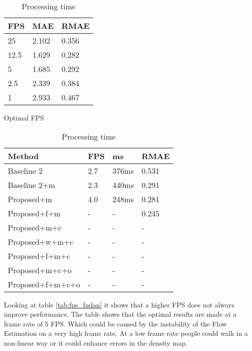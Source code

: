 \begin{table}[!htb]
\begin{minipage}{.5\linewidth}
\centering
\begin{tabular}{lll}
		\hline
		FPS                               & MAE & RMAE \\ \hline
		\multicolumn{1}{l|}{25}          & 2.102 & 0.356 \\
		\multicolumn{1}{l|}{12.5}        & 1.629 & 0.282 \\
		\multicolumn{1}{l|}{5}        & 1.685 & 0.292 \\
		\multicolumn{1}{l|}{2.5} & 2.339 & 0.384 \\
		\multicolumn{1}{l|}{1} & 2.933 & 0.467 \\ \hline
		\end{tabular}
\caption{\label{tab:fps_fudan} Optimal FPS}
\end{minipage}
\begin{minipage}{.5\linewidth}
\centering
\begin{tabular}{llll}
\hline
Method                             & FPS & ms & RMAE \\ \hline
\multicolumn{1}{l|}{Baseline 2}    & 2.7 & 376ms & 0.531 \\
\multicolumn{1}{l|}{Baseline 2+m} & 2.3 & 440ms & 0.291\\
\multicolumn{1}{l|}{Proposed+m}      & 4.0 & 248ms & 0.281 \\
\multicolumn{1}{l|}{Proposed+f+m} &- & - & 0.245 \\
\multicolumn{1}{l|}{Proposed+m+c}        & - & - & - \\
\multicolumn{1}{l|}{Proposed+w+m+c}        & - & - & - \\
\multicolumn{1}{l|}{Proposed+f+m+c}        & - & - & - \\
\multicolumn{1}{l|}{Proposed+m+c+o} & - & - & - \\
\multicolumn{1}{l|}{Proposed+f+m+c+o} & - & - & - \\ \hline
\end{tabular}
\caption{\label{tab:processing_fudan}Processing time}
\end{minipage} %
\end{table}

Looking at table \ref{tab:fps_fudan} it shows that a higher FPS does not always improve performance. The table shows that the optimal results are made at a frame rate of 5 FPS. Which could be caused by the instability of the Flow Estimation on a very high frame rate. At a low frame rate people could walk in a non-linear way or it could enhance errors in the density map.

